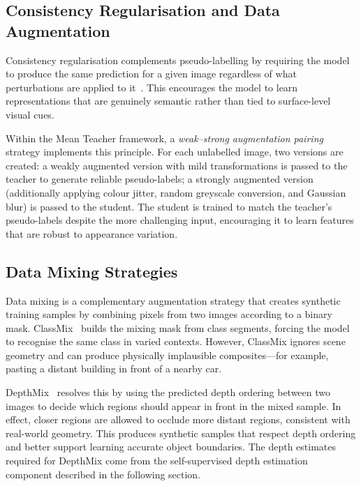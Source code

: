 \subsection{Consistency Regularisation and Data Augmentation}

Consistency regularisation complements pseudo-labelling by requiring the
model to produce the same prediction for a given image regardless of what
perturbations are applied to it~\cite{sohn2020fixmatch}. This encourages
the model to learn representations that are genuinely semantic rather
than tied to surface-level visual cues.

Within the Mean Teacher framework, a \emph{weak--strong augmentation
pairing} strategy implements this principle. For each unlabelled image,
two versions are created: a weakly augmented version with mild
transformations is passed to the teacher to generate reliable pseudo-labels;
a strongly augmented version (additionally applying colour jitter, random
greyscale conversion, and Gaussian blur) is passed to the student. The
student is trained to match the teacher's pseudo-labels despite the more
challenging input, encouraging it to learn features that are robust to
appearance variation.

\subsection{Data Mixing Strategies}
\label{sec:data-mixing}

Data mixing is a complementary augmentation strategy that creates
synthetic training samples by combining pixels from two images according
to a binary mask. ClassMix~\cite{olsson2021classmix} builds the mixing
mask from class segments, forcing the model to recognise the same class
in varied contexts. However, ClassMix ignores scene geometry and can
produce physically implausible composites---for example, pasting a
distant building in front of a nearby car.

DepthMix~\cite{hoyer2023improving} resolves this by using the predicted
depth ordering between two images to decide which regions should appear
in front in the mixed sample. In effect, closer regions are allowed to
occlude more distant regions, consistent with real-world geometry. This
produces synthetic samples that respect depth ordering and better support
learning accurate object boundaries. The depth estimates required for
DepthMix come from the self-supervised depth estimation component
described in the following section.

